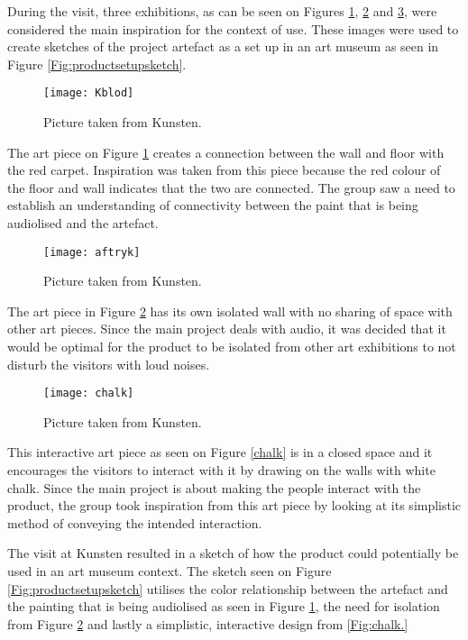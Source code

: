 During the visit, three exhibitions, as can be seen on Figures \ref{Fig:Kblod}, \ref{Fig:aftryk} and \ref{Fig:chalk}, were considered the main inspiration for the context of use. These images were used to create sketches of the project artefact as a set up in an art museum as seen in Figure \ref{Fig:productsetupsketch}.

\begin{figure}[!h]
\centering
\texttt{[image: Kblod]}
\caption{\label{Fig:Kblod} Picture taken from Kunsten.}
\end{figure}
The art piece on Figure \ref{Fig:Kblod} creates a connection between the wall and floor with the red carpet. Inspiration was taken from this piece because the red colour of the floor and wall indicates that the two are connected. The group saw a need to establish an understanding of connectivity between the paint that is being audiolised and the artefact.

\begin{figure}[!h]
\centering
\texttt{[image: aftryk]}
\caption{\label{Fig:aftryk} Picture taken from Kunsten.}
\end{figure}

The art piece in Figure \ref{Fig:aftryk} has its own isolated wall with no sharing of space with other art pieces. Since the main project deals with audio, it was decided that it would be optimal for the product to be isolated from other art exhibitions to not disturb the visitors with loud noises.

\begin{figure}[!h]
\centering
\texttt{[image: chalk]}
\caption{\label{Fig:chalk} Picture taken from Kunsten.}
\end{figure}

This interactive art piece as seen on Figure \ref{chalk} is in a closed space and it encourages the visitors to interact with it by drawing on the walls with white chalk. Since the main project is about making the people interact with the product, the group took inspiration from this art piece by looking at its simplistic method of conveying the intended interaction.

The visit at Kunsten resulted in a sketch of how the product could potentially be used in an art museum context. The sketch seen on Figure \ref{Fig:productsetupsketch} utilises the color relationship between the artefact and the painting that is being audiolised as seen in Figure \ref{Fig:Kblod}, the need for isolation from Figure \ref{Fig:aftryk} and lastly a simplistic, interactive design from \ref{Fig:chalk.}

